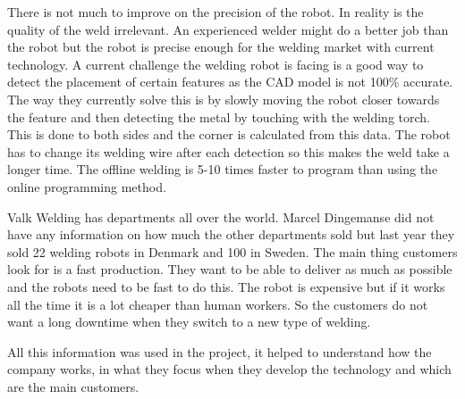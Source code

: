 There is not much to improve on the precision of the robot.
In reality is the quality of the weld irrelevant. 
An experienced welder might do a better job than the robot but the robot is precise enough for the welding market with current technology.
A current challenge the welding robot is facing is a good way to detect the placement of certain features as the CAD model is not 100\% accurate.
The way they currently solve this is by slowly moving the robot closer towards the feature and then detecting the metal by touching with the welding torch. 
This is done to both sides and the corner is calculated from this data.
The robot has to change its welding wire after each detection so this makes the weld take a longer time.
The offline welding is 5-10 times faster to program than using the online programming method. 

Valk Welding has departments all over the world. 
Marcel Dingemanse did not have any information on how much the other departments sold but last year they sold 22 welding robots in Denmark and 100 in Sweden.
The main thing customers look for is a fast production.
They want to be able to deliver as much as possible and the robots need to be fast to do this.
The robot is expensive but if it works all the time it is a lot cheaper than human workers.
So the customers do not want a long downtime when they switch to a new type of welding.

All this information was used in the project, it helped to understand how the company works, in what they focus when they develop the technology and which are the main customers.
